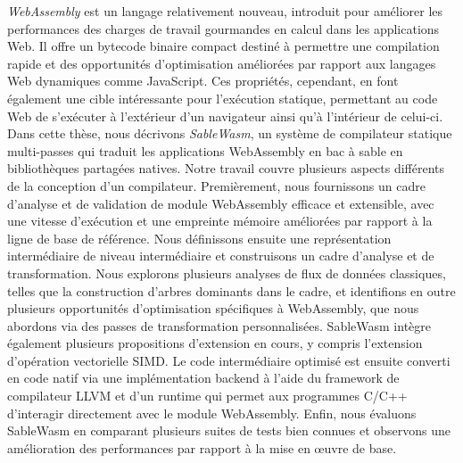\begin{spacing}{1.5}
    \emph{WebAssembly} est un langage relativement nouveau, introduit pour
    améliorer les performances des charges de travail gourmandes en calcul dans
    les applications Web. Il offre un bytecode binaire compact destiné à
    permettre une compilation rapide et des opportunités d'optimisation
    améliorées par rapport aux langages Web dynamiques comme JavaScript. Ces
    propriétés, cependant, en font également une cible intéressante pour
    l'exécution statique, permettant au code Web de s'exécuter à l'extérieur
    d'un navigateur ainsi qu'à l'intérieur de celui-ci. Dans cette thèse, nous
    décrivons \emph{SableWasm}, un système de compilateur statique multi-passes
    qui traduit les applications WebAssembly en bac à sable en bibliothèques
    partagées natives. Notre travail couvre plusieurs aspects différents de la
    conception d'un compilateur. Premièrement, nous fournissons un cadre
    d'analyse et de validation de module WebAssembly efficace et extensible,
    avec une vitesse d'exécution et une empreinte mémoire améliorées par rapport
    à la ligne de base de référence. Nous définissons ensuite une représentation
    intermédiaire de niveau intermédiaire et construisons un cadre d'analyse et
    de transformation. Nous explorons plusieurs analyses de flux de données
    classiques, telles que la construction d'arbres dominants dans le cadre, et
    identifions en outre plusieurs opportunités d'optimisation spécifiques à
    WebAssembly, que nous abordons via des passes de transformation
    personnalisées. SableWasm intègre également plusieurs propositions
    d'extension en cours, y compris l'extension d'opération vectorielle SIMD.
    Le code intermédiaire optimisé est ensuite converti en code natif via une
    implémentation backend à l'aide du framework de compilateur LLVM et d'un
    runtime qui permet aux programmes C/C++ d'interagir directement avec le
    module WebAssembly. Enfin, nous évaluons SableWasm en comparant plusieurs
    suites de tests bien connues et observons une amélioration des performances
    par rapport à la mise en œuvre de base.
\end{spacing}